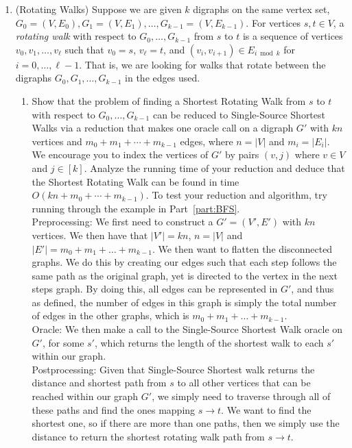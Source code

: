 \documentclass[11pt]{article}
\begin{document}
\begin{enumerate}
    \item  (Rotating Walks)  
    Suppose we are given $k$ digraphs on the same vertex set, $G_0=(V,E_0), G_1=(V,E_1), \ldots, G_{k-1}=(V,E_{k-1})$.  For vertices $s,t\in V$, a {\em rotating walk} with respect to $G_0,\ldots,G_{k-1}$ from $s$ to $t$ is a sequence of vertices $v_0,v_1,\ldots,v_{\ell}$ such that $v_0=s$, $v_\ell=t$, and $(v_i,v_{i+1})\in E_{i \bmod k}$ for $i=0,\ldots,\ell-1$.  That is, we are looking for walks that rotate between the digraphs $G_0,G_1,\ldots,G_{k-1}$ in the edges used.
    \begin{enumerate}
        \item Show that the problem of finding a Shortest Rotating Walk from $s$ to $t$ with respect to $G_0,\ldots,G_{k-1}$ 
        can be reduced to Single-Source Shortest Walks via a reduction that makes one oracle call on 
        a digraph $G'$ with $kn$ vertices and $m_0+m_1+\cdots+m_{k-1}$ edges, where $n=|V|$ and $m_i=|E_i|$.
        We encourage you to index the vertices of $G'$ by pairs $(v,j)$ where $v\in V$ and $j\in [k]$. 
        Analyze the running time of your reduction and deduce that the Shortest Rotating Walk can be found in time $O(kn+m_0+\cdots+m_{k-1})$.
        \label{part:ReduceToOrdinary}  To test your reduction and algorithm, try running through the example in Part~\ref{part:BFS}. \\
        
        Preprocessing: We first need to construct a $G' = (V', E')$ with $kn$ vertices. We then have that $|V'| = kn$, $n = |V|$ and $|E'| = m_0 + m_1 + \dots + m_{k-1}$. We then want to flatten the disconnected graphs. We do this by creating our edges such that each step follows the same path as the original graph, yet is directed to the vertex in the next steps graph. By doing this, all edges can be represented in $G'$, and thus as defined, the number of edges in this graph is simply the total number of edges in the other graphs, which is $m_0 + m_1 + \dots + m_{k-1}$. \\
        
        Oracle: We then make a call to the Single-Source Shortest Walk oracle on $G'$, for some $s'$, which returns the length of the shortest walk to each $s'$ within our graph. \\
        
        Postprocessing: Given that Single-Source Shortest walk returns the distance and shortest path from $s$ to all other vertices that can be reached within our graph $G'$, we simply need to traverse through all of these paths and find the ones mapping $s \to t$. We want to find the shortest one, so if there are more than one paths, then we simply use the distance to return the shortest rotating walk path from $s \to t$. \\
        

\end{enumerate}
\end{enumerate}
\end{document}
